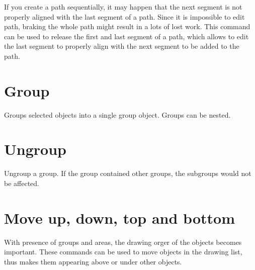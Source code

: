 If you create a path sequentially, it may happen that the next segment is not properly aligned
with the last segment of a path. Since it is impossible to edit path, braking the whole path
might result in a lots of lost work. This command can be used to release the first and last
segment of a path, which allows to edit the last segment to properly align with the next
segment to be added to the path.

\section{Group}\label{sec:group}

Groups selected objects into a single group object. Groups can be nested.

\section{Ungroup}\label{sec:ungroup}

Ungroup a group. If the group contained other groups, the subgroups would not be affected.

\section{Move up, down, top and bottom}\label{sec:moveupdown}

With presence of groups and areas, the drawing orger of the objects becomes important.
These commands can be used to move objects in the drawing list, thus makes them
appearing above or under other objects.
